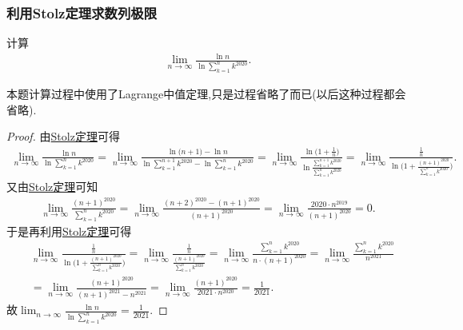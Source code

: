 \documentclass[../../main.tex]{subfiles}
\begin{document}
\subsubsection{利用Stolz定理求数列极限}

\begin{example}
计算
\begin{align*}
\lim_{n \to \infty} \frac{\ln n}{\ln \sum\limits_{k = 1}^{n} k^{2020}}.
\end{align*}
\end{example}
\begin{note}
本题计算过程中使用了Lagrange中值定理,只是过程省略了而已(以后这种过程都会省略).
\end{note}
\begin{proof}
由\hyperref[theorem:Stolz定理]{Stolz定理}可得
\begin{align*}
\lim_{n \to \infty} \frac{\ln n}{\ln \sum\limits_{k = 1}^{n} k^{2020}}=\lim_{n\rightarrow \infty} \frac{\ln\mathrm{(}n+1)-\ln n}{\ln \sum\limits_{k=1}^{n+1}{k^{2020}}-\ln \sum\limits_{k=1}^n{k^{2020}}}=\lim_{n\rightarrow \infty} \frac{\ln\mathrm{(}1+\frac{1}{n})}{\ln \frac{\sum\limits_{k=1}^{n+1}{k^{2020}}}{\sum\limits_{k=1}^n{k^{2020}}}}=\lim_{n\rightarrow \infty} \frac{\frac{1}{n}}{\ln\mathrm{(}1+\frac{(n+1)^{2020}}{\sum\limits_{k=1}^n{k^{2020}}})}.
\end{align*}
又由\hyperref[theorem:Stolz定理]{Stolz定理}可知
\begin{align*}
\lim_{n\rightarrow \infty} \frac{(n+1)^{2020}}{\sum\limits_{k=1}^n{k^{2020}}}=\lim_{n\rightarrow \infty} \frac{(n+2)^{2020}-(n+1)^{2020}}{(n+1)^{2020}}=\lim_{n\rightarrow \infty} \frac{2020\cdot n^{2019}}{(n+1)^{2020}}=0.
\end{align*}
于是再利用\hyperref[theorem:Stolz定理]{Stolz定理}可得
\begin{align*}
&\lim_{n\rightarrow \infty} \frac{\frac{1}{n}}{\ln\mathrm{(}1+\frac{(n+1)^{2020}}{\sum\limits_{k=1}^n{k^{2020}}})}=\lim_{n\rightarrow \infty} \frac{\frac{1}{n}}{\frac{(n+1)^{2020}}{\sum\limits_{k=1}^n{k^{2020}}}}=\lim_{n\rightarrow \infty} \frac{\sum\limits_{k=1}^n{k^{2020}}}{n\cdot (n+1)^{2020}}=\lim_{n\rightarrow \infty} \frac{\sum\limits_{k=1}^n{k^{2020}}}{n^{2021}}  \\
&=\lim_{n\rightarrow \infty} \frac{(n+1)^{2020}}{(n+1)^{2021}-n^{2021}}=\lim_{n\rightarrow \infty} \frac{(n+1)^{2020}}{2021\cdot n^{2020}}=\frac{1}{2021}.
\end{align*}
故$\lim_{n \to \infty} \frac{\ln n}{\ln \sum\limits_{k = 1}^{n} k^{2020}}=\frac{1}{2021}$.
\end{proof}
\end{document}
